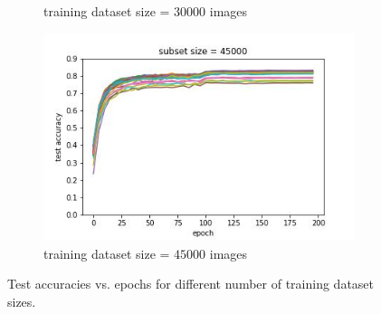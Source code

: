 \documentclass{article} %
\begin{document}
\begin{figure}
\begin{subfigure}{.5\textwidth}
        \caption{training dataset size = $30000$ images}
        \label{fig:subsetsize30000}
      \end{subfigure}%
      \begin{subfigure}{.5\textwidth}
        \centering
        \includegraphics[width=.8\linewidth]{test_acc_vs_epoch_subset_size_45000}
        \caption{training dataset size = $45000$ images}
        \label{fig:subsetsize45000}
      \end{subfigure}
  
    \caption{Test accuracies vs. epochs for different number of training dataset sizes.}
    \label{fig:accuracy_vs_epoch_by_subset_size}
\end{figure}

\end{document}
